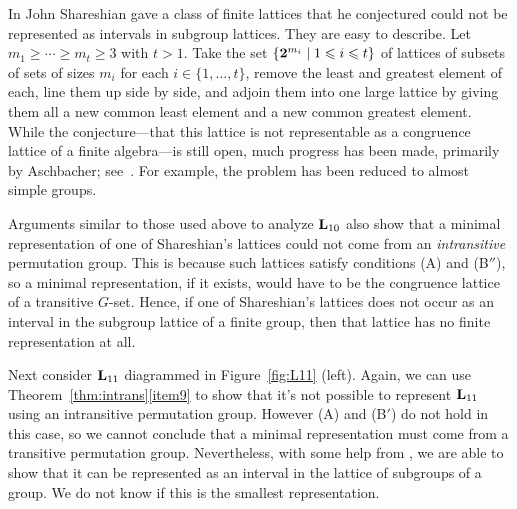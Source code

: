 In \cite{Shareshian2003} John Shareshian gave a class of finite lattices that
he conjectured could not be represented as intervals in subgroup lattices.
They are easy to describe. Let $m_1 \ge \cdots \ge m_t \ge 3$ with $t> 1$.
Take the set $\{\mathbf{2}^{m_i} \mid 1\leqslant i \leqslant t\}$ of 
lattices of subsets of sets of sizes $m_i$ for each $i\in \{1,\ldots,t\}$, remove
the least and greatest element of each, line them up side by side, and adjoin
them into one large lattice by giving them all a new common least element and a
new common greatest element. While the conjecture---that this lattice is not
representable as a congruence lattice of a finite algebra---is still open, much
progress has been made, primarily by Aschbacher; see~\cite{Aschbacher2013}.
For example, the problem has been reduced to almost simple groups.


Arguments similar to those used above to analyze $\mathbf{L}_{10}$
also show that a minimal representation of one of Shareshian's
lattices could not come from an \emph{intransitive} permutation group.
This is because such lattices satisfy conditions (A) and (B$''$),
so a minimal representation, if it exists, would have to be
the congruence lattice of a transitive $G$-set.
Hence, if one of Shareshian's lattices does not occur as an
interval in the subgroup lattice of a finite group, then that lattice has
no finite representation at all.



Next consider $\mathbf{L}_{11}$ diagrammed in Figure~\ref{fig:L11} (left). Again, we
can use Theorem~\ref{thm:intrans}\eqref{item9} to show that it's not possible to
represent $\mathbf{L}_{11}$ using an intransitive permutation group. However (A) and
(B$'$) do not hold in this case, so we cannot conclude that a minimal representation
must come from a transitive permutation group. Nevertheless, with some help from
\gap, we are able to show that it can be represented as an interval
in the lattice of subgroups of a group. We do not know if this is the
smallest representation.


